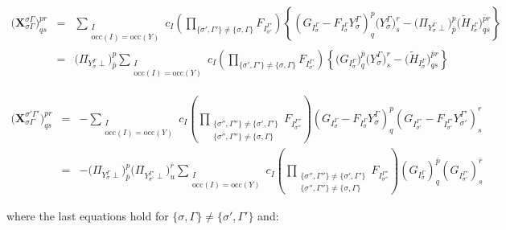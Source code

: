 \documentclass[a4paper,11pt]{article}
\begin{document}
\begin{eqnarray}
  \big( \mathbf{X}_{\sigma \Gamma}^{\sigma \Gamma} \big)^{pr}_{qs} &=&
  \sum_{\substack{I\\\text{occ}(I) = \text{occ}(Y)}} c_I
  \left( \prod_{\{\sigma', \Gamma'\} \ne \{\sigma, \Gamma\}} F_{I_{\sigma'}^{\Gamma'}} \right)
  \left\{ \left( G_{I_\sigma^\Gamma} - F_{I_\sigma^\Gamma} Y_\sigma^\Gamma  \right)^p_q \big( Y_\sigma^\Gamma \big)^r_s
  - \big( \Pi_{Y_\sigma^\Gamma \perp} \big)^p_{\bar{p}} \big( \tilde{H}_{I_\sigma^\Gamma} \big)^{\bar{p}r}_{qs} \right\}\\
  &=&
  \big( \Pi_{Y_\sigma^\Gamma \perp} \big)^p_{\bar{p}}
  \sum_{\substack{I\\\text{occ}(I) = \text{occ}(Y)}} c_I
  \left( \prod_{\{\sigma', \Gamma'\} \ne \{\sigma, \Gamma\}} F_{I_{\sigma'}^{\Gamma'}} \right)
  \left\{ \big( G_{I_\sigma^\Gamma} \big)^{\bar{p}}_q \big( Y_\sigma^\Gamma \big)^r_s
  - \big( \tilde{H}_{I_\sigma^\Gamma} \big)^{{\bar{p}}r}_{qs} \right\}
\end{eqnarray}

\begin{eqnarray}
  \big( \mathbf{X}_{\sigma \Gamma}^{\sigma' \Gamma'} \big)^{pr}_{qs} &=&
  -%
  \sum_{\substack{I\\\text{occ}(I) = \text{occ}(Y)}} c_I
  \left(
    \prod_{\substack{
        \{\sigma'', \Gamma''\} \ne \{\sigma', \Gamma'\} \\
        \{\sigma'', \Gamma''\} \ne \{\sigma , \Gamma \}}}
    F_{I_{\sigma''}^{\Gamma''}} \right)
  \left( G_{I_\sigma^\Gamma} - F_{I_\sigma^\Gamma} Y_\sigma^\Gamma  \right)^p_q
  \left( G_{I_{\sigma'}^{\Gamma'}} - F_{I_{\sigma'}^{\Gamma'}} Y_{\sigma'}^{\Gamma'} \right)^r_s\\
  &=&
  -%
  \big( \Pi_{Y_\sigma^\Gamma \perp} \big)^p_{\bar{p}}
  \big( \Pi_{Y_{\sigma'}^{\Gamma'} \perp} \big)^{\bar{r}}_u
  \sum_{\substack{I\\\text{occ}(I) = \text{occ}(Y)}} c_I
  \left(
    \prod_{\substack{
        \{\sigma'', \Gamma''\} \ne \{\sigma', \Gamma'\} \\
        \{\sigma'', \Gamma''\} \ne \{\sigma , \Gamma \}}}
    F_{I_{\sigma''}^{\Gamma''}} \right)
  \left( G_{I_\sigma^\Gamma}  \right)^{\bar{p}}_q
  \left( G_{I_{\sigma'}^{\Gamma'}} \right)^{\bar{r}}_s
\end{eqnarray}

where the last equations hold for ${\{\sigma,\Gamma\} \ne \{\sigma',\Gamma'\}}$ and:
\end{document}

